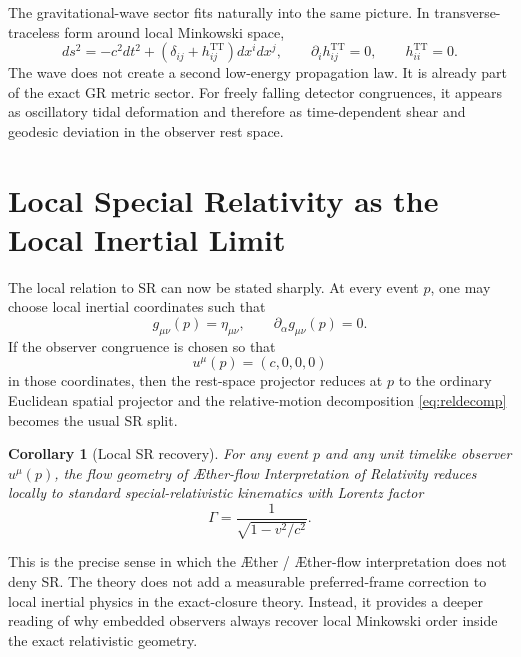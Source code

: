 \documentclass[11pt]{article}
\newcommand{\Aether}{\AE{}ther}
\newcommand{\Aflow}{\AE{}ther-flow}
\newcommand{\TheoryName}{\Aflow{} Interpretation of Relativity}
\newtheorem{corollary}{Corollary}
\begin{document}
The gravitational-wave sector fits naturally into the same picture. In transverse-traceless form around local Minkowski space,
\begin{equation}
ds^2
=
-c^2dt^2
+
\left(\delta_{ij}+h^{\mathrm{TT}}_{ij}\right)dx^i dx^j,
\qquad
\partial_i h^{\mathrm{TT}}_{ij}=0,
\qquad
h^{\mathrm{TT}}_{ii}=0.
\label{eq:ttmetric}
\end{equation}
The wave does not create a second low-energy propagation law. It is already part of the exact GR metric sector. For freely falling detector congruences, it appears as oscillatory tidal deformation and therefore as time-dependent shear and geodesic deviation in the observer rest space.

\section{Local Special Relativity as the Local Inertial Limit}

The local relation to SR can now be stated sharply. At every event \(p\), one may choose local inertial coordinates such that
\begin{equation}
g_{\mu\nu}(p)=\eta_{\mu\nu},
\qquad
\partial_\alpha g_{\mu\nu}(p)=0.
\label{eq:localinertial}
\end{equation}
If the observer congruence is chosen so that
\begin{equation}
u^\mu(p)=(c,0,0,0)
\label{eq:localobserver}
\end{equation}
in those coordinates, then the rest-space projector reduces at \(p\) to the ordinary Euclidean spatial projector and the relative-motion decomposition \eqref{eq:reldecomp} becomes the usual SR split.

\begin{corollary}[Local SR recovery]
For any event \(p\) and any unit timelike observer \(u^\mu(p)\), the flow geometry of \TheoryName{} reduces locally to standard special-relativistic kinematics with Lorentz factor
\begin{equation}
\Gamma=\frac{1}{\sqrt{1-v^2/c^2}}.
\label{eq:localsr}
\end{equation}
\end{corollary}

This is the precise sense in which the \Aether{} / \Aflow{} interpretation does not deny SR. The theory does not add a measurable preferred-frame correction to local inertial physics in the exact-closure theory. Instead, it provides a deeper reading of why embedded observers always recover local Minkowski order inside the exact relativistic geometry.
\end{document}
